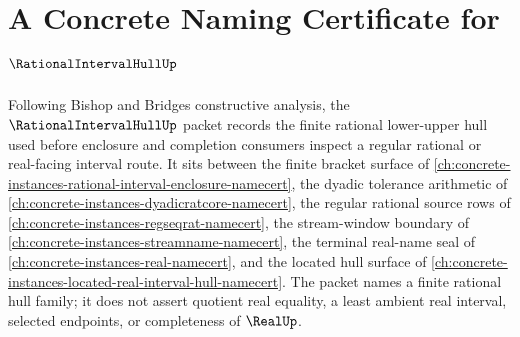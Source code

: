 \chapter{A Concrete Naming Certificate for $\RationalIntervalHullUp$}
\label{ch:concrete-instances-rational-interval-hull-namecert}

Following Bishop and Bridges constructive analysis, the $\RationalIntervalHullUp$ packet records the finite rational lower-upper hull used before enclosure and completion consumers inspect a regular rational or real-facing interval route. It sits between the finite bracket surface of \autoref{ch:concrete-instances-rational-interval-enclosure-namecert}, the dyadic tolerance arithmetic of \autoref{ch:concrete-instances-dyadicratcore-namecert}, the regular rational source rows of \autoref{ch:concrete-instances-regseqrat-namecert}, the stream-window boundary of \autoref{ch:concrete-instances-streamname-namecert}, the terminal real-name seal of \autoref{ch:concrete-instances-real-namecert}, and the located hull surface of \autoref{ch:concrete-instances-located-real-interval-hull-namecert}. The packet names a finite rational hull family; it does not assert quotient real equality, a least ambient real interval, selected endpoints, or completeness of $\RealUp$.

